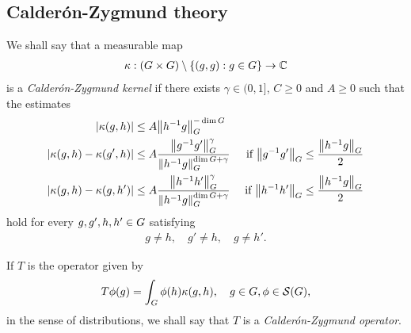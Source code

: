 \subsection{Calder\'on-Zygmund theory}

\begin{definition}
    We shall say that a measurable map
    \begin{align*}
        \kappa : (\Group \times \Group) \setminus \{(g, g) : g \in \Group\} \to \C
    \end{align*}
    is a \emph{Calder\'on-Zygmund kernel}
    if there exists $\gamma \in (0, 1]$,
    $C \geq 0$ and $A \geq 0$ such that the estimates
    \begin{align*}
        \abs {\kappa(g, h)} &\leq A \norm [\Group] {h^{-1} g}^{-\dim \Group} &\\
        \abs {\kappa(g, h) - \kappa(g', h)} &\leq A \frac {\norm [\Group] {g^{-1} g'}^{\gamma}} {\norm [\Group] {h^{-1} g}^{\dim \Group + \gamma}}
        &\text{ if } \norm [\Group] {g^{-1} g'} \leq \frac {\norm [\Group] {h^{-1} g}} 2\\
        \abs {\kappa(g, h) - \kappa(g, h')} &\leq A \frac {\norm [\Group] {h^{-1} h'}^{\gamma}} {\norm [\Group] {h^{-1} g}^{\dim \Group + \gamma}}
        &\text{ if } \norm [\Group] {h^{-1} h'} \leq \frac {\norm [\Group] {h^{-1} g}} 2
    \end{align*}
    hold for every $g, g', h, h' \in \Group$ satisfying
    \begin{align*}
        g \neq h, \quad
        g' \neq h, \quad
        g \neq h'.
    \end{align*}

    If $T$ is the operator given by
    \begin{align*}
        T \phi(g) = \int_\Group \phi(h) \kappa(g, h),
        \quad g \in \Group, \phi \in \Schwartz \Group,
    \end{align*}
    in the sense of distributions,
    we shall say that $T$ is a \emph{Calder\'on-Zygmund operator}.
\end{definition}

